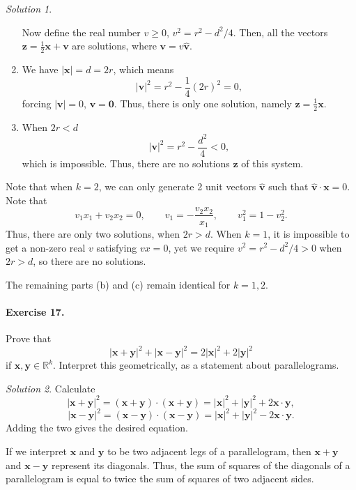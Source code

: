 \documentclass[11pt]{report}
\def\R{\mathbb{R}}
\renewcommand\vec\boldsymbol
\def\vx{\vec{x}}
\def\vy{\vec{y}}
\def\vz{\vec{z}}
\theoremstyle{remark}
\newtheorem*{solution}{Solution}
\begin{document}
\begin{solution}
\begin{enumerate}
            Now define the real number $v \geq 0$, $v^2 = r^2 - d^2 / 4$. Then,
            all the vectors $\vz = \frac{1}{2}\vx + \vec{v}$ are
            solutions, where $\vec{v} = v\hat{\vec{v}}$.

            \item We have $|\vx| = d = 2r$, which means \[
                |\vec{v}|^2 = r^2 - \frac{1}{4}(2r)^2 = 0,
            \] forcing $|\vec{v}| = 0$, $\vec{v} = \vec{0}$. Thus, there is only one
            solution, namely $\vz = \frac{1}{2}\vx$.

            \item When $2r < d$ \[
                |\vec{v}|^2 = r^2 - \frac{d^2}{4} < 0,
            \] which is impossible. Thus, there are no solutions $\vz$ of this
            system.
        \end{enumerate}
        Note that when $k = 2$, we can only generate 2 unit vectors $\hat{\vec{v}}$
        such that $\hat{\vec{v}}\cdot\vx = 0$. Note that \[
            v_1x_1 + v_2x_2 = 0, \qquad v_1 = -\frac{v_2x_2}{x_1}, \qquad v_1^2 = 1
            - v_2^2.
        \] Thus, there are only two solutions, when $2r > d$. When $k = 1$, it is
        impossible to get a non-zero real $v$ satisfying $vx = 0$, yet we require
        $v^2 = r^2 - d^2 / 4 > 0$ when $2r > d$, so there are no solutions.

        The remaining parts (b) and (c) remain identical for $k = 1, 2$.
    \end{solution}
    
    \paragraph{Exercise 17.} Prove that \[
        |\vx + \vy|^2 + |\vx - \vy|^2 = 2|\vx|^2 + 2|\vy|^2
    \] if $\vx, \vy \in \R^k$. Interpret this geometrically, as a statement about
    parallelograms.
    \begin{solution}
        Calculate \[
            |\vx + \vy|^2 = (\vx + \vy)\cdot(\vx + \vy) = |\vx|^2 + |\vy|^2 +
            2\vx\cdot\vy,
        \] \[
            |\vx - \vy|^2 = (\vx - \vy)\cdot(\vx - \vy) = |\vx|^2 + |\vy|^2 -
            2\vx\cdot\vy.
        \] Adding the two gives the desired equation.

        If we interpret $\vx$ and $\vy$ to be two adjacent legs of a parallelogram,
        then $\vx + \vy$ and $\vx - \vy$ represent its diagonals. Thus, the sum of
        squares of the diagonals of a parallelogram is equal to twice the sum of
        squares of two adjacent sides.
    \end{solution}
\end{document}
